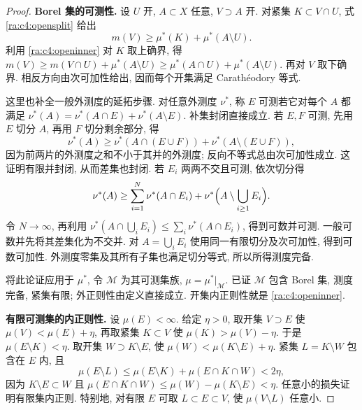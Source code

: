 \begin{proof}
\textbf{Borel 集的可测性.} 设 $U$ 开, $A\subset X$ 任意, $V\supset A$ 开. 对紧集 $K\subset V\cap U$, 式 \eqref{ra:c4:opensplit} 给出
\[
 m(V)\ge\mu^*(K)+\mu^*(A\setminus U).
\]
利用 \eqref{ra:c4:openinner} 对 $K$ 取上确界, 得 $m(V)\ge m(V\cap U)+\mu^*(A\setminus U)\ge\mu^*(A\cap U)+\mu^*(A\setminus U)$. 再对 $V$ 取下确界. 相反方向由次可加性给出, 因而每个开集满足 Carath\'eodory 等式.

这里也补全一般外测度的延拓步骤. 对任意外测度 $\nu^*$, 称 $E$ 可测若它对每个 $A$ 都满足 $\nu^*(A)=\nu^*(A\cap E)+\nu^*(A\setminus E)$. 补集封闭直接成立. 若 $E,F$ 可测, 先用 $E$ 切分 $A$, 再用 $F$ 切分剩余部分, 得
\[
 \nu^*(A)\ge\nu^*(A\cap(E\cup F))+\nu^*(A\setminus(E\cup F)),
\]
因为前两片的外测度之和不小于其并的外测度; 反向不等式总由次可加性成立. 这证明有限并封闭, 从而差集也封闭. 若 $E_i$ 两两不交且可测, 依次切分得
\[
 \nu^*(A)\ge\sum_{i=1}^N\nu^*(A\cap E_i)
       +\nu^*\Bigl(A\setminus\bigcup_{i\ge1}E_i\Bigr).
\]
令 $N\to\infty$, 再利用 $\nu^*(A\cap\bigcup_iE_i)\le\sum_i\nu^*(A\cap E_i)$, 得到可数并可测. 一般可数并先将其差集化为不交并. 对 $A=\bigcup_iE_i$ 使用同一有限切分及次可加性, 得到可数可加性. 外测度零集及其所有子集也满足切分等式, 所以所得测度完备.

将此论证应用于 $\mu^*$, 令 $\mathcal M$ 为其可测集族, $\mu=\mu^*|_{\mathcal M}$. 已证 $\mathcal M$ 包含 Borel 集, 测度完备, 紧集有限; 外正则性由定义直接成立. 开集内正则性就是 \eqref{ra:c4:openinner}.

\textbf{有限可测集的内正则性.} 设 $\mu(E)<\infty$. 给定 $\eta>0$, 取开集 $V\supset E$ 使 $\mu(V)<\mu(E)+\eta$, 再取紧集 $K\subset V$ 使 $\mu(K)>\mu(V)-\eta$. 于是 $\mu(E\setminus K)<\eta$. 取开集 $W\supset K\setminus E$, 使 $\mu(W)<\mu(K\setminus E)+\eta$. 紧集 $L=K\setminus W$ 包含在 $E$ 内, 且
\[
 \mu(E\setminus L)
 \le\mu(E\setminus K)+\mu(E\cap K\cap W)<2\eta,
\]
因为 $K\setminus E\subset W$ 且 $\mu(E\cap K\cap W)\le\mu(W)-\mu(K\setminus E)<\eta$. 任意小的损失证明有限集内正则. 特别地, 对有限 $E$ 可取 $L\subset E\subset V$, 使 $\mu(V\setminus L)$ 任意小.


\end{proof}
